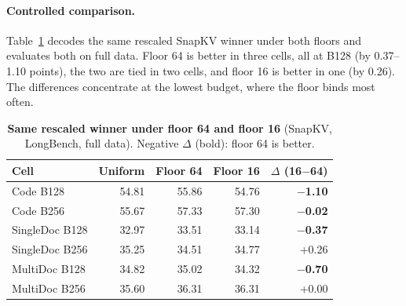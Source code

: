\paragraph{Controlled comparison.} Table~\ref{tab:app-floor-ablation} decodes the same rescaled SnapKV winner under both floors and evaluates both on full data. Floor 64 is better in three cells, all at B128 (by 0.37--1.10 points), the two are tied in two cells, and floor 16 is better in one (by 0.26). The differences concentrate at the lowest budget, where the floor binds most often.

\begin{table}[H]
  \centering
  \footnotesize
  \setlength{\tabcolsep}{3pt}
  \begin{tabular}{@{}l r r r r@{}}
    \toprule
    Cell & Uniform & Floor 64 & Floor 16 & $\Delta$ (16$-$64) \\
    \midrule
    Code B128 & 54.81 & 55.86 & 54.76 & \textbf{$-$1.10} \\
    Code B256 & 55.67 & 57.33 & 57.30 & \textbf{$-$0.02} \\
    SingleDoc B128 & 32.97 & 33.51 & 33.14 & \textbf{$-$0.37} \\
    SingleDoc B256 & 35.25 & 34.51 & 34.77 & +0.26 \\
    MultiDoc B128 & 34.82 & 35.02 & 34.32 & \textbf{$-$0.70} \\
    MultiDoc B256 & 35.60 & 36.31 & 36.31 & +0.00 \\
    \bottomrule
  \end{tabular}
  \caption{\textbf{Same rescaled winner under floor 64 and floor 16} (SnapKV, LongBench, full data). Negative $\Delta$ (bold): floor 64 is better.}
  \label{tab:app-floor-ablation}
\end{table}

